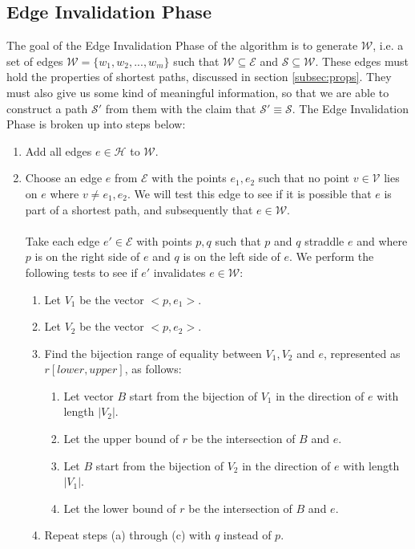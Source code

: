 \documentclass[12pt]{article}
\begin{document}
\subsection{Edge Invalidation Phase}\label{subsec:edge-gen}
The goal of the Edge Invalidation Phase of the algorithm is to generate $\mathcal{W}$,
i.e. a set of
edges $\mathcal{W} = \{w_1, w_2, ..., w_m\}$ such that
$\mathcal{W} \subseteq \mathcal{E}$ and $\mathcal{S} \subseteq \mathcal{W}$.
These edges must hold the properties of shortest paths, discussed in section
\ref{subsec:props}.
They must also give us some kind of meaningful information, so that we are able to
construct a path $\mathcal{S}'$ from them with the claim that
$\mathcal{S}' \equiv \mathcal{S}$.
The Edge Invalidation Phase is broken up into steps below:
\begin{enumerate}
\item Add all edges $e \in \mathcal{H}$ to $\mathcal{W}$.
\item Choose an edge $e$ from $\mathcal{E}$ with the points $e_1,e_2$ such that
no point $v \in \mathcal{V}$ lies on $e$ where $v \neq e_1,e_2$.
We will test this edge to see if it is possible that $e$ is part of a shortest path,
and subsequently that $e \in \mathcal{W}$.
\\\\
Take each edge $e' \in \mathcal{E}$ with points $p,q$ such that $p$ and $q$ straddle
$e$ and where $p$ is on the right side
of $e$ and $q$ is on the left side of $e$.
We perform the following tests to see if $e'$ invalidates $e \in \mathcal{W}$:
\begin{enumerate}
\item Let $V_1$ be the vector $<p,e_1>$.
\item Let $V_2$ be the vector $<p,e_2>$.
\item Find the bijection range of equality between $V_1,V_2$ and $e$,
represented as $r[lower, upper]$, as follows:
\begin{enumerate}
\item Let vector $B$ start from the bijection of $V_1$
in the direction of $e$ with length $|V_2|$.
\item Let the upper bound of $r$ be the intersection of $B$ and $e$.
\item Let $B$ start from the bijection of $V_2$
in the direction of $e$ with length $|V_1|$.
\item Let the lower bound of $r$ be the intersection of $B$ and $e$.
\end{enumerate}
\item Repeat steps (a) through (c) with $q$ instead of $p$.

\end{enumerate}
\end{enumerate}
\end{document}
